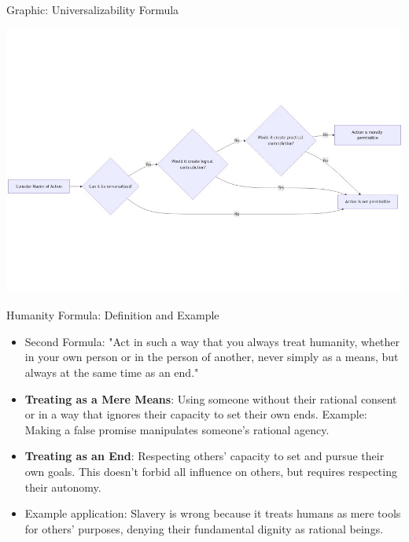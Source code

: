 \documentclass{beamer}
\begin{document}
\begin{frame}{Graphic: Universalizability Formula}

\includegraphics[scale=.35]{ci_universalize}

\end{frame}


\begin{frame}{Humanity Formula: Definition and Example}
\begin{itemize}
    \item Second Formula: "Act in such a way that you always treat humanity, whether in your own person or in the person of another, never simply as a means, but always at the same time as an end."
    
    \item \textbf{Treating as a Mere Means}: Using someone without their rational consent or in a way that ignores their capacity to set their own ends. Example: Making a false promise manipulates someone's rational agency.
    
    \item \textbf{Treating as an End}: Respecting others' capacity to set and pursue their own goals. This doesn't forbid all influence on others, but requires respecting their autonomy.
    
    \item Example application: Slavery is wrong because it treats humans as mere tools for others' purposes, denying their fundamental dignity as rational beings.
\end{itemize}
\end{frame}
\end{document}
